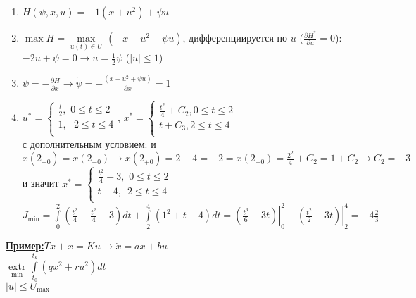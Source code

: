 \documentclass[preprint,russian,a5paper,10pt,twoside,mediummath]{ncc}
\newcommand{\ExampleMy}{\vspace{\baselineskip}\textbf{\underline{Пример:}}}
\begin{document}
\begin{enumerate}
\item $H\left( \psi ,x,u \right)=-1\left( x+{{u}^{2}} \right)+\psi u$
\item $\max H=\underset{u\left( t \right)\in U}{\mathop{\max }}\,\left( -x-{{u}^{2}}+\psi u \right)$, дифференциируется по $u$ ($\frac{\partial {{H}^{*}}}{\partial u}=0$):$-2u+\psi =0\to u=\frac{1}{2}\psi $ ($\left| u \right|\le 1$)
\item $\psi =-\frac{\partial H}{\partial x}\to \dot{\psi }=-\frac{\left( x-{{u}^{2}}+\psi u \right)}{\partial x}=1$
\item ${{u}^{*}}=\left\{ \begin{array}{*{35}{l}}
   \frac{t}{2},\,\,0\le t\le 2  \\
   1,\,\,\,\,2\le t\le 4  \\
\end{array} \right.$, ${{x}^{*}}=\left\{ \begin{array}{*{35}{l}}
   \frac{{{t}^{2}}}{4}+{{C}_{2}},0\le t\le 2  \\
   t+{{C}_{3}},2\le t\le 4  \\
\end{array} \right.$
\\с дополнительным условием: 
и $x\left( {{2}_{+0}} \right)=x\left( {{2}_{-0}} \right)\to x\left( {{2}_{+0}} \right)=2-4=-2=x\left( {{2}_{-0}} \right)=\frac{{{2}^{2}}}{4}+{{C}_{2}}=1+{{C}_{2}}\to {{C}_{2}}=-3$ и значит ${{x}^{*}}=\left\{ \begin{array}{*{35}{l}}
   \frac{{{t}^{2}}}{4}-3,\,\,0\le t\le 2  \\
   t-4,\,\,\,2\le t\le 4  \\
\end{array} \right.$
\\${{J}_{\min }}=\int\limits_{0}^{2}{\left( \frac{{{t}^{2}}}{4}+\frac{{{t}^{2}}}{4}-3 \right)}dt+\int\limits_{2}^{4}{\left( {{1}^{2}}+t-4 \right)}dt=\left. \left( \frac{{{t}^{3}}}{6}-3t \right) \right|_{0}^{2}+\left. \left( \frac{{{t}^{2}}}{2}-3t \right) \right|_{2}^{4}=-4\frac{2}{3}$ 
\end{enumerate}
\ExampleMy $T\dot{x}+x=Ku\to \dot{x}=ax+bu$ 
\\$\underset{\min }{\mathop{extr}}\,\int\limits_{{{t}_{0}}}^{{{t}_{k}}}{\left( q{{x}^{2}}+r{{u}^{2}} \right)}dt$
\\$\left| u \right|\le {{U}_{\max }}$
\end{document}

